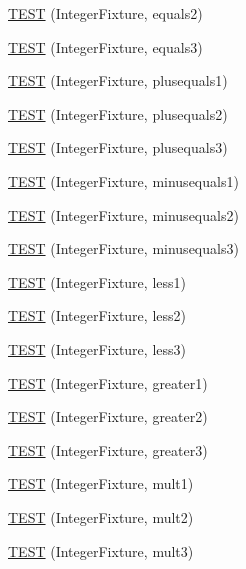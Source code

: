 \begin{DoxyCompactItemize}
\hyperlink{temp_test_integer_8c_09_09_ae58932a92711f57ac65494c4ead377d2}{T\-E\-S\-T} (Integer\-Fixture, equals2)
\item 
\hyperlink{temp_test_integer_8c_09_09_a42ba62d3f14fe4b5cff95a34e8f13b6d}{T\-E\-S\-T} (Integer\-Fixture, equals3)
\item 
\hyperlink{temp_test_integer_8c_09_09_acf172005d59d90ec2a717dc5c24ad116}{T\-E\-S\-T} (Integer\-Fixture, plusequals1)
\item 
\hyperlink{temp_test_integer_8c_09_09_af4b1d9aec3f53685874e394058933ddf}{T\-E\-S\-T} (Integer\-Fixture, plusequals2)
\item 
\hyperlink{temp_test_integer_8c_09_09_ab38cb518840e042d883dbd9f99294cfd}{T\-E\-S\-T} (Integer\-Fixture, plusequals3)
\item 
\hyperlink{temp_test_integer_8c_09_09_aad7c7f1df8a17754b672fb0814028594}{T\-E\-S\-T} (Integer\-Fixture, minusequals1)
\item 
\hyperlink{temp_test_integer_8c_09_09_ad3f011001948053ea04e26bd5785eafb}{T\-E\-S\-T} (Integer\-Fixture, minusequals2)
\item 
\hyperlink{temp_test_integer_8c_09_09_a50852386400cfffa90dcea55467ee8b2}{T\-E\-S\-T} (Integer\-Fixture, minusequals3)
\item 
\hyperlink{temp_test_integer_8c_09_09_a7eab988ae79730f25939e28590af6fe9}{T\-E\-S\-T} (Integer\-Fixture, less1)
\item 
\hyperlink{temp_test_integer_8c_09_09_a7b6b4b595f6c5f3e5f7716dc68b85860}{T\-E\-S\-T} (Integer\-Fixture, less2)
\item 
\hyperlink{temp_test_integer_8c_09_09_a44c4b5f6952d68d45f29fd40b16aa826}{T\-E\-S\-T} (Integer\-Fixture, less3)
\item 
\hyperlink{temp_test_integer_8c_09_09_aba5303513d3c169fc11d047aae16656b}{T\-E\-S\-T} (Integer\-Fixture, greater1)
\item 
\hyperlink{temp_test_integer_8c_09_09_a897c0eb0c03a330f83d9ec2a6fdcd947}{T\-E\-S\-T} (Integer\-Fixture, greater2)
\item 
\hyperlink{temp_test_integer_8c_09_09_a63f2ed7e8e3587850fd28be378d8a93e}{T\-E\-S\-T} (Integer\-Fixture, greater3)
\item 
\hyperlink{temp_test_integer_8c_09_09_a5d30a6ab911b01849840d6d47c2ade65}{T\-E\-S\-T} (Integer\-Fixture, mult1)
\item 
\hyperlink{temp_test_integer_8c_09_09_a6c3d51862b488434aa06e22be78e4ab6}{T\-E\-S\-T} (Integer\-Fixture, mult2)
\item 
\hyperlink{temp_test_integer_8c_09_09_af7570044c2a5bf577285576ffa999335}{T\-E\-S\-T} (Integer\-Fixture, mult3)

\end{DoxyCompactItemize}
